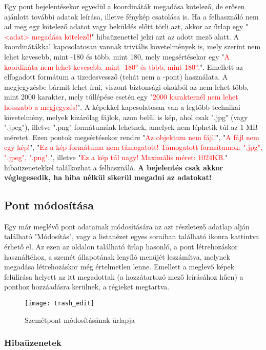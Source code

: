 Egy pont bejelentésekor egyedül a koordináták megadása kötelező, de erősen ajánlott további adatok leírása, illetve fénykép csatolása is. Ha a felhasználó nem ad meg egy kötelező adatot vagy beküldés előtt törli azt, akkor az űrlap egy "\textcolor{red}{<adat> megadása kötelező!}" hibaüzenettel jelzi azt az adott mező alatt. A koordinátákkal kapcsolatosan vannak triviális követelmények is, mely szerint nem lehet kevesebb, mint -180 és több, mint 180, mely megsértésekor egy "\textcolor{red}{A koordináta nem lehet kevesebb, mint -180° és több, mint 180°.}". Emellett az elfogadott formátum a tizedesvessző (tehát nem a -pont) használata. A megjegyzésbe bármit lehet írni, viszont biztonsági okokból az nem lehet több, mint 2000 karakter, mely túllépése esetén egy "\textcolor{red}{2000 karakternél nem lehet hosszabb a megjegyzés!}". A képekkel kapcsolatosan van a legtöbb technikai követelmény, melyek kizárólag fájlok, azon belül is kép, ahol csak ".jpg" (vagy ".jpeg"), illetve ".png" formátumúak lehetnek, amelyek nem léphetik túl az 1 MB méretet. Ezen pontok megsértésekor rendre "\textcolor{red}{Az objektum nem fájl!}", "\textcolor{red}{A fájl nem egy kép!}", "\textcolor{red}{Ez a kép formátuma nem támogatott! Támogatott formátumok: ".jpg", ".jpeg", ".png".}", illetve "\textcolor{red}{Ez a kép túl nagy! Maximális méret: 1024KB.}" hibaüzenetekkel találkozhat a felhasználó. \textbf{A bejelentés csak akkor véglegesedik, ha hiba nélkül sikerül megadni az adatokat!}

\subsection{Pont módosítása}

Egy már meglévő pont adatainak módosítására az azt részletező adatlap alján található "Módosítás", vagy a listanézet egyes soraiban található  ikonra kattintva érhető el. Az ezen az oldalon található űrlap hasonló, a pont létrehozáskor használtéhoz, a szemét állapotának lenyíló menüjét leszámítva, melynek megadása létrehozáskor még értelmetlen lenne. Emellett a meglevő képek felülírása helyett az itt megadottak (a hozzátartozó mező leírásához hűen) a ponthoz hozzáadásra kerülnek, a régieket megtartva.

\begin{figure}[H]
	\centering
	\texttt{[image: trash\_edit]}
	\caption{Szemétpont módosításának űrlapja}
	\label{fig:trash_edit}
\end{figure}

\subsubsection{Hibaüzenetek}

